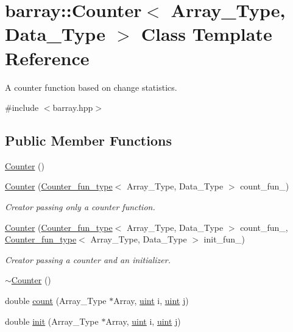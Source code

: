 \hypertarget{classbarray_1_1_counter}{}\section{barray\+:\+:Counter$<$ Array\+\_\+\+Type, Data\+\_\+\+Type $>$ Class Template Reference}
\label{classbarray_1_1_counter}


A counter function based on change statistics.  




{\ttfamily \#include $<$barray.\+hpp$>$}

\subsection*{Public Member Functions}
\begin{DoxyCompactItemize}
\item 
\hyperlink{classbarray_1_1_counter_a29e59942649210fb06f4f908854b3cae}{Counter} ()
\item 
\hyperlink{classbarray_1_1_counter_a3840e841d0a985a685bdee5e9e735446}{Counter} (\hyperlink{namespacebarray_a94903bd0f37708633933ea88ac8e4c6a}{Counter\+\_\+fun\+\_\+type}$<$ Array\+\_\+\+Type, Data\+\_\+\+Type $>$ count\+\_\+fun\+\_\+)
\begin{DoxyCompactList}\small\item\em Creator passing only a counter function. \end{DoxyCompactList}\item 
\hyperlink{classbarray_1_1_counter_a85cf71665d85384afcd672f28408b389}{Counter} (\hyperlink{namespacebarray_a94903bd0f37708633933ea88ac8e4c6a}{Counter\+\_\+fun\+\_\+type}$<$ Array\+\_\+\+Type, Data\+\_\+\+Type $>$ count\+\_\+fun\+\_\+, \hyperlink{namespacebarray_a94903bd0f37708633933ea88ac8e4c6a}{Counter\+\_\+fun\+\_\+type}$<$ Array\+\_\+\+Type, Data\+\_\+\+Type $>$ init\+\_\+fun\+\_\+)
\begin{DoxyCompactList}\small\item\em Creator passing a counter and an initializer. \end{DoxyCompactList}\item 
\hyperlink{classbarray_1_1_counter_a9f44b2f1f6a4df5b36a9fb2479969e02}{$\sim$\+Counter} ()
\item 
double \hyperlink{classbarray_1_1_counter_afe1d23e72c3bdca9b2481f36ebde1d95}{count} (Array\+\_\+\+Type $\ast$Array, \hyperlink{namespacebarray_af9756a31953db233f80a9cfe1ef31c32}{uint} i, \hyperlink{namespacebarray_af9756a31953db233f80a9cfe1ef31c32}{uint} j)
\item 
double \hyperlink{classbarray_1_1_counter_ae0451979ddc51a5fbf00de78c37d3216}{init} (Array\+\_\+\+Type $\ast$Array, \hyperlink{namespacebarray_af9756a31953db233f80a9cfe1ef31c32}{uint} i, \hyperlink{namespacebarray_af9756a31953db233f80a9cfe1ef31c32}{uint} j)
\end{DoxyCompactItemize}

